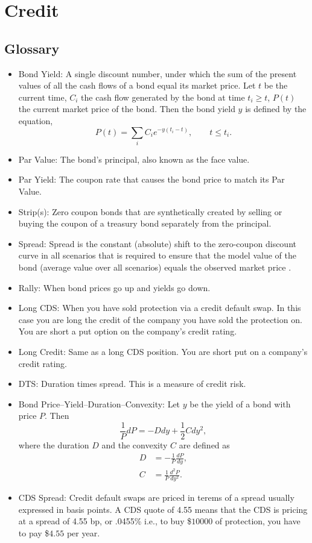 \documentclass{amsart}
\theoremstyle{plain}
\numberwithin{equation}{section}
\begin{document}
\section{Credit}
\subsection{Glossary}
\begin{itemize}
\item Bond Yield: A single discount number, under which
the sum of the present values of all the cash flows of a bond equal 
its market price. Let $t$ be the current time, $C_i$ the cash flow generated by the bond at
time $t_i \geq t$, $P(t)$ the current market price of the bond. Then the bond yield
$y$ is defined by the equation,
\begin{equation}
P(t) = \sum_{i} C_i e^{- y (t_i - t )}, \qquad t \leq t_i.
\label{eq:bond_yield}
\end{equation}
\item Par Value: The bond's principal, also known as the face value. 
\item Par Yield: The coupon rate that causes the bond price to match 
its Par Value.
\item Strip(s): Zero coupon bonds that are synthetically created by 
selling or buying the coupon of a treasury bond separately from the principal.
\item Spread: Spread is the constant (absolute) shift to the zero-coupon discount curve in all scenarios that is required to ensure that the model value of the bond (average value over all scenarios) equals the observed market price \cite{dor2007dtssm}.
\item Rally: When bond prices go up and yields go down.
\item Long CDS: When you have sold protection via a credit default swap. In this 
case you are long the credit of the company you have sold the protection on. You 
are short a put option on the company's credit rating. 
\item Long Credit: Same as a long CDS position. You are short put on a 
company's credit rating.
\item DTS: Duration times spread. This is a measure of credit risk.
\item Bond Price--Yield--Duration--Convexity:
Let $y$ be the yield of a bond with price $P$. Then  
\begin{equation}
\frac{1}{P} dP = -D dy + \frac{1}{2} C dy^2,
\end{equation}
where the duration $D$ and the convexity 
$C$ are defined as
\begin{align*}
D &= -\frac{1}{P}\frac{dP}{dy},\\
C &=  \frac{1}{P}\frac{d^2P}{dy^2}.
\end{align*}

\item CDS Spread: Credit default swaps are priced in terems of a spread usually expressed in basis points. A CDS quote of 4.55 means that the CDS is pricing at a spread of 4.55 bp, or .0455\% i.e., to buy \$$10000$ of protection, you have to pay \$$4.55$ per year.
\end{itemize}
\end{document}
